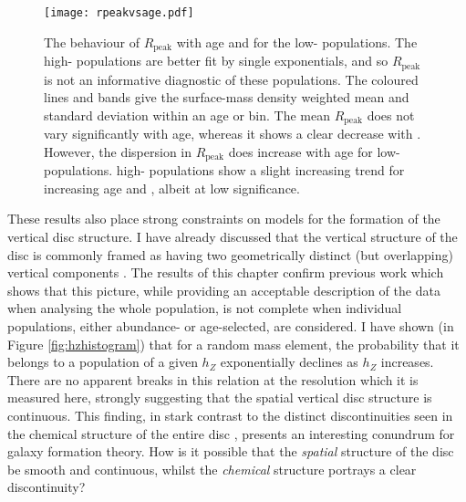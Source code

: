 \begin{figure}
	\texttt{[image: rpeakvsage.pdf]}
	\centering
   \caption[Peak radius of surface density profiles in the low-\afe{} mono-age, mono-\feh{} populations in APOGEE DR12, shown as a function of age and \feh{}]{The behaviour of $R_{\mathrm{peak}}$ with age and \feh{} for the low-\afe{} populations. The high-\afe{} populations are better fit by single exponentials, and so $R_{\mathrm{peak}}$ is not an informative diagnostic of these populations. The coloured lines and bands give the surface-mass density weighted mean and standard deviation within an age or \feh{} bin. The mean $R_{\mathrm{peak}}$ does not vary significantly with age, whereas it shows a clear decrease with \feh{}. However, the dispersion in $R_{\mathrm{peak}}$ does increase with age for low-\afe{} populations. high-\afe{} populations show a slight increasing trend for increasing age and \feh{}, albeit at low significance. }
    \label{fig:rpeakvsage}
 \end{figure}


These results also place strong constraints on models for the formation of the vertical disc structure. I have already discussed that the vertical structure of the disc is commonly framed as having two geometrically distinct (but overlapping) vertical components \citep[e.g.][]{1983MNRAS.202.1025G}. The results of this chapter confirm previous work \citep[e.g.][]{2012ApJ...751..131B} which shows that this picture, while providing an acceptable description of the data when analysing the whole population, is not complete when individual populations, either abundance- or age-selected, are considered. I have shown (in Figure \ref{fig:hzhistogram}) that for a random mass element, the probability that it belongs to a population of a given $h_Z$ exponentially declines as $h_Z$ increases. There are no apparent breaks in this relation at the resolution which it is measured here, strongly suggesting that the spatial vertical disc structure is continuous. This finding, in stark contrast to the distinct discontinuities seen in the chemical structure of the entire disc \citep[e.g][]{2014ApJ...796...38N,2015ApJ...808..132H}, presents an interesting conundrum for galaxy formation theory. How is it possible that the \emph{spatial} structure of the disc be smooth and continuous, whilst the \emph{chemical} structure portrays a clear discontinuity?

